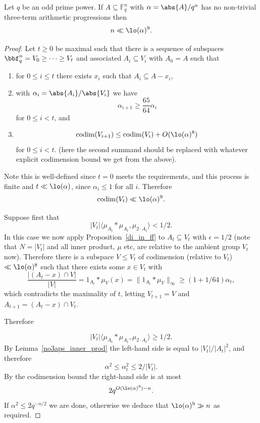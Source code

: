 \begin{theorem}
  \label{ff}
  \uses{}
  \leanok

  Let $q$ be an odd prime power. If $A\subseteq \mathbb{F}_q^n$ with $\alpha=\abs{A}/q^n$ has no non-trivial three-term arithmetic progressions then
  \[n \ll \lo(\alpha)^9.\]
\end{theorem}
\begin{proof}
  \leanok

  Let $t\geq 0$ be maximal such that there is a sequence of subspaces $\bbf_q^n=V_0\geq \cdots \geq V_t$ and associated $A_i\subseteq V_i$ with $A_0=A$ such that
  \begin{enumerate}
  \item for $0\leq i\leq t$ there exists $x_i$ such that $A_i\subseteq A-x_i$,
  \item with $\alpha_i=\abs{A_i}/\abs{V_i}$ we have
  \[\alpha_{i+1}\geq \frac{65}{64}\alpha_i\]
  for $0\leq i<t$, and
  \item \[\mathrm{codim} (V_{i+1}) \leq \mathrm{codim}(V_i)+O(\lo(\alpha)^8)\]
  for $0\leq i<t$. (here the second summand should be replaced with whatever explicit codimension bound we get from the above).
  \end{enumerate}

  Note this is well-defined since $t=0$ meets the requirements, and this process is finite and $t \ll \lo(\alpha)$, since $\alpha_i\leq 1$ for all $i$. Therefore
  \[\mathrm{codim}(V_t) \ll \lo(\alpha)^9.\]

  Suppose first that
  \[\lvert V_t\rvert\langle \mu_{A_t}\ast \mu_{A_t},\mu_{2\cdot A_t}\rangle<1/2.\]
  In this case we now apply Proposition~\ref{di_in_ff} to $A_t\subseteq V_t$ with $\epsilon=1/2$ (note that $N=\lvert V_t\rvert$ and all inner product, $\mu$ etc, are relative to the ambient group $V_t$ now). Therefore there is a subspace $V\leq V_t$ of codimension (relative to $V_t$) $\ll \lo(\alpha)^8$ such that there exists some $x\in V_t$ with
  \[\frac{\lvert (A_t-x)\cap V\rvert}{\lvert V\rvert}=1_{A_t}\ast \mu_V(x)=\| 1_{A_t}\ast \mu_V\|_\infty \geq (1+1/64)\alpha_t,\]
  which contradicts the maximality of $t$, letting $V_{t+1}=V$ and $A_{t+1}=(A_t-x)\cap V_t$.

  Therefore

  \[\lvert V_t\rvert\langle \mu_{A_t}\ast \mu_{A_t},\mu_{2\cdot A_t}\rangle\geq 1/2.\]
  By Lemma~\ref{no3aps_inner_prod} the left-hand side is equal to $\lvert V_t\rvert/\lvert A_t\rvert^2$, and therefore
  \[\alpha^2 \leq \alpha_t^2 \leq 2/\lvert V_t\rvert.\]
  By the codimension bound the right-hand side is at most
  \[2q^{O(\lo(\alpha)^9)-n}.\]
  If $\alpha^2 \leq 2q^{-n/2}$ we are done, otherwise we deduce that $\lo(\alpha)^9 \gg n$ as required.
\end{proof}


